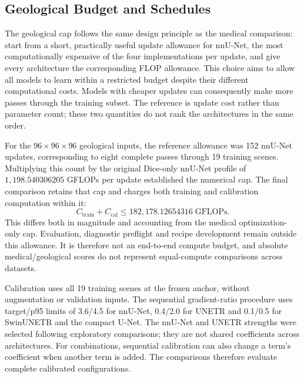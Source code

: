 \documentclass[12pt,a4paper]{article}
\begin{document}
\subsection{Geological Budget and Schedules}\label{sec:geological-budget-details}

The geological cap follows the same design principle as the medical
comparison: start from a short, practically useful update allowance for
nnU-Net, the most computationally expensive of the four implementations
per update, and give every architecture the corresponding FLOP allowance.
This choice aims to allow all models to learn within a restricted budget
despite their different computational costs. Models with cheaper updates
can consequently make more passes through the training subset. The
reference is update cost rather than parameter count; these two quantities
do not rank the architectures in the same order.

For the $96\times96\times96$ geological inputs, the reference allowance
was 152 nnU-Net updates, corresponding to eight complete passes through
19 training scenes. Multiplying this count by the original Dice-only
nnU-Net profile of $1{,}198.540306205$ GFLOPs per update established the
numerical cap. The final comparison retains that cap and charges both
training and calibration computation within it:
\begin{equation}
 C_{\mathrm{train}}+C_{\mathrm{cal}}
 \leq 182{,}178.12654316\;\mathrm{GFLOPs}.
\label{eq:geological-compute-cap}
\end{equation}
This differs both in magnitude and accounting from the medical
optimization-only cap. Evaluation, diagnostic preflight and recipe
development remain outside this allowance. It is therefore not an
end-to-end compute budget, and absolute medical/geological scores do
not represent equal-compute comparisons across datasets.

Calibration uses all 19 training scenes at the frozen anchor, without
augmentation or validation inputs. The sequential gradient-ratio
procedure uses target/p95 limits of 3.6/4.5 for nnU-Net, 0.4/2.0 for
UNETR and 0.1/0.5 for SwinUNETR and the compact U-Net. The nnU-Net
and UNETR strengths were selected following exploratory comparisons;
they are not shared coefficients across architectures. For combinations,
sequential calibration can also change a term's coefficient when another
term is added. The comparisons therefore evaluate complete calibrated
configurations.
\end{document}
